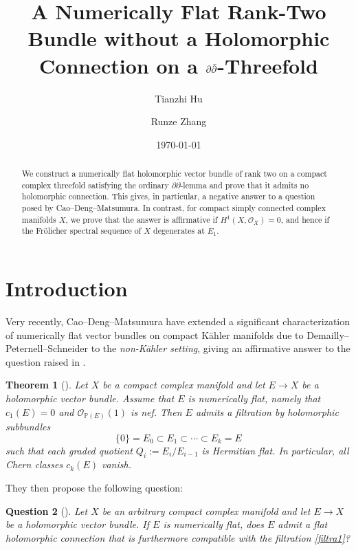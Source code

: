 \documentclass[11pt]{amsart}
\title[A numerically flat rank-two bundle on a $\ddbar$-threefold]
{A Numerically Flat Rank-Two Bundle without a Holomorphic Connection
	on a $\ddbar$-Threefold}
\author{Tianzhi Hu}
\author{Runze Zhang}
\date{\today}
\newcommand{\ddbar}{\partial\bar\partial}
\numberwithin{equation}{section}
\newtheorem{theorem} {Theorem} [section]
\theoremstyle{definition}
\theoremstyle{plain}
\newtheorem{question}[theorem]{Question}
\theoremstyle{plain}
\theoremstyle{definition}
\theoremstyle{stepstyle}
\let\oldmaketitle\maketitle
\renewcommand\maketitle{{\bfseries\boldmath\oldmaketitle}}
\begin{document}
	\begin{abstract}
		We construct a numerically flat holomorphic vector bundle of rank two
		on a compact complex threefold satisfying the ordinary $\ddbar$-lemma
		and prove that it admits no holomorphic connection.
		This gives, in particular, a negative answer to a question posed by
		Cao--Deng--Matsumura.
		In contrast, for compact simply connected complex manifolds $X$,
		we prove that the answer is affirmative if
		$H^1(X,\mathcal O_X)=0$, and hence if the Fr\"olicher spectral
		sequence of $X$ degenerates at $E_1$.
	\end{abstract}
	\maketitle
	\section{Introduction}
	Very recently, Cao--Deng--Matsumura have extended a significant
	characterization of numerically flat vector bundles on compact
	K\"ahler manifolds due to Demailly--Peternell--Schneider
	\cite[Theorem 1.18]{DPS} to the \textit{non-K\"ahler setting},
	giving an affirmative answer to the question raised in
	\cite[Remark 1.21]{DPS}.
	
	\begin{theorem}[{\cite[Theorem 1.3]{CDM}}]\label{numflatnonkahler}
		Let $X$ be a compact complex manifold and let $E\to X$ be a
		holomorphic vector bundle.
		Assume that $E$ is numerically flat, namely that $c_1(E)=0$
		and $\mathcal O_{\mathbb P(E)}(1)$ is nef.
		Then $E$ admits a filtration by holomorphic subbundles
		\begin{equation}\label{filtra1}
			\{0\}=E_0\subset E_1\subset\cdots\subset E_k=E
		\end{equation}
		such that each graded quotient $Q_i:=E_i/E_{i-1}$ is Hermitian flat.
		In particular, all Chern classes $c_k(E)$ vanish.
	\end{theorem}
	
	They then propose the following question:
	\begin{question}[{\cite[Question 5.4]{CDM}}]\label{Q_1}
		Let $X$ be an arbitrary compact complex manifold and let
		$E\to X$ be a holomorphic vector bundle.
		If $E$ is numerically flat, does $E$ admit a flat holomorphic
		connection that is furthermore compatible with the
		filtration \eqref{filtra1}?
	\end{question}
	
\end{document}
